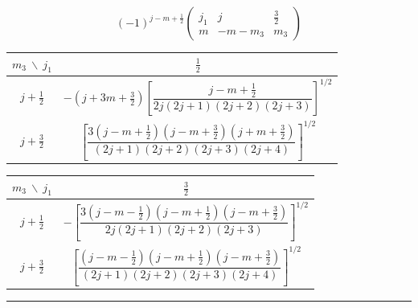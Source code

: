 \begin{equation*}
  (-1)^{j-m+\frac12}\left(\begin{array}{ccc}j_1&j&\tfrac32\\m&-m-m_3&m_3\end{array}\right)
\end{equation*}
\begin{center}
\renewcommand{\arraystretch}{1.7}%
\begin{tabular}{c|c}
  $m_3\ \backslash\ j_1$ & $\tfrac12$\\ \hline
  $j+\tfrac12$ & $-\left(j+3m+\tfrac32\right)
  \left[\dfrac{j-m+\tfrac12}{2j(2j+1)(2j+2)(2j+3)}\right]^{1/2}$\\[10pt]
  $j+\tfrac32$ & $\left[\dfrac{3\left(j-m+\tfrac12\right)\left(j-m+\tfrac32\right)\left(j+m+\tfrac32\right)}
  {(2j+1)(2j+2)(2j+3)(2j+4)}\right]^{1/2}$\\[10pt]
\end{tabular}

\medskip

\begin{tabular}{c|c}
  $m_3\ \backslash\ j_1$ & $\tfrac32$\\ \hline
  $j+\tfrac12$ & $-\left[\dfrac{3\left(j-m-\tfrac12\right)\left(j-m+\tfrac12\right)\left(j-m+\tfrac32\right)}
  {2j(2j+1)(2j+2)(2j+3)}\right]^{1/2}$\\[10pt]
  $j+\tfrac32$ & $\left[\dfrac{\left(j-m-\tfrac12\right)\left(j-m+\tfrac12\right)\left(j-m+\tfrac32\right)}
  {(2j+1)(2j+2)(2j+3)(2j+4)}\right]^{1/2}$\\[10pt]
\end{tabular}
\end{center}

\medskip\noindent\rule{\linewidth}{0.5pt}\medskip


